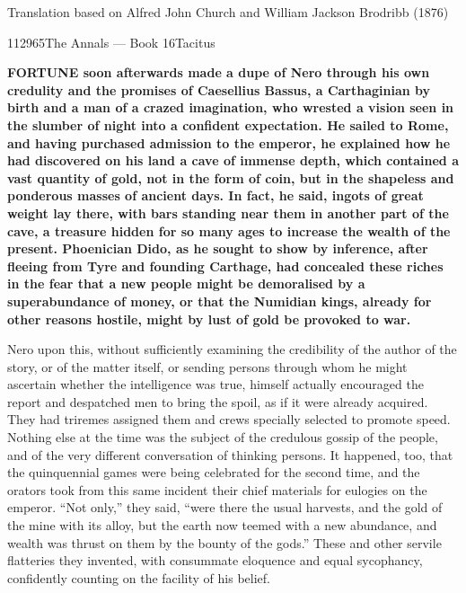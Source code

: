 Translation based on Alfred John Church and William Jackson Brodribb (1876)

112965The Annals — Book 16Tacitus


\textbf{FORTUNE soon afterwards made a dupe of Nero through his own credulity and the promises of Caesellius Bassus, a Carthaginian by birth and a man of a crazed imagination, who wrested a vision seen in the slumber of night into a confident expectation. He sailed to Rome, and having purchased admission to the emperor, he explained how he had discovered on his land a cave of immense depth, which contained a vast quantity of gold, not in the form of coin, but in the shapeless and ponderous masses of ancient days. In fact, he said, ingots of great weight lay there, with bars standing near them in another part of the cave, a treasure hidden for so many ages to increase the wealth of the present. Phoenician Dido, as he sought to show by inference, after fleeing from Tyre and founding Carthage, had concealed these riches in the fear that a new people might be demoralised by a superabundance of money, or that the Numidian kings, already for other reasons hostile, might by lust of gold be provoked to war.}


Nero upon this, without sufficiently examining the credibility of the author of the story, or of the matter itself, or sending persons through whom he might ascertain whether the intelligence was true, himself actually encouraged the report and despatched men to bring the spoil, as if it were already acquired. They had triremes assigned them and crews specially selected to promote speed. Nothing else at the time was the subject of the credulous gossip of the people, and of the very different conversation of thinking persons. It happened, too, that the quinquennial games were being celebrated for the second time, and the orators took from this same incident their chief materials for eulogies on the emperor. ``Not only,'' they said, ``were there the usual harvests, and the gold of the mine with its alloy, but the earth now teemed with a new abundance, and wealth was thrust on them by the bounty of the gods.'' These and other servile flatteries they invented, with consummate eloquence and equal sycophancy, confidently counting on the facility of his belief.


